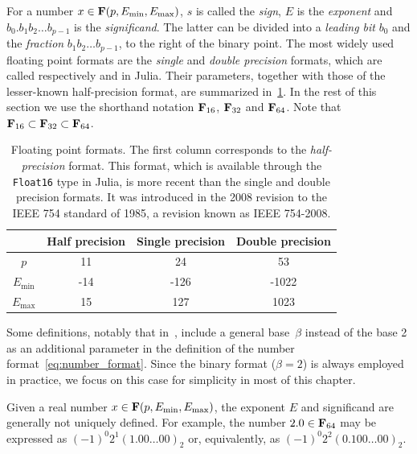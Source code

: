 For a number $x \in \mathbf F(p, E_{\min}, E_{\max})$,
$s$ is called the \emph{sign}, $E$ is the \emph{exponent} and
$b_0. b_1 b_2 \dots b_{p-1}$ is the \emph{significand}.
The latter can be divided into a \emph{leading bit} $b_0$ and the \emph{fraction} $b_1 b_2 \dots b_{p-1}$,
to the right of the binary point.
The most widely used floating point formats are the \emph{single} and \emph{double precision} formats,
which are called respectively  and  in Julia.
Their parameters,
together with those of the lesser-known half-precision format,
are summarized in~\cref{table:floating_point_formats}.
In the rest of this section we use the shorthand notation $\mathbf F_{16}$, $\mathbf F_{32}$ and $\mathbf F_{64}$.
Note that $\mathbf F_{16} \subset \mathbf F_{32} \subset \mathbf F_{64}$.
\begin{table}[ht]
    \centering
    \begin{tabular}{|c|c|c|c|}
        \hline
        & Half precision & Single precision & Double precision
        \\ \hline
        $p$ & 11 & 24 & 53
        \\ \hline
        $E_{\min}$ & -14 & -126 & -1022
        \\ \hline
        $E_{\max}$ & 15 & 127 & 1023
        \\ \hline
    \end{tabular}
    \caption{%
        Floating point formats.
        The first column corresponds to the \emph{half-precision} format.
        This format,
        which is available through the \texttt{Float16} type in Julia,
        is more recent than the single and double precision formats.
        It was introduced in the 2008 revision to the IEEE 754 standard of 1985,
        a revision known as IEEE 754-2008.
    }%
    \label{table:floating_point_formats}
\end{table}

\begin{remark}
    Some definitions,
    notably that in~\cite[Section 2.5.2]{MR2265914},
    include a general base~$\beta$ instead of the base 2
    as an additional parameter in the definition of the number format~\eqref{eq:number_format}.
    Since the binary format ($\beta = 2$) is always employed in practice,
    we focus on this case for simplicity in most of this chapter.
\end{remark}

\begin{remark}
    \label{remark:roundoff_non_uniqueness}
    Given a real number $x \in \mathbf F (p, E_{\min}, E_{\max})$,
    the exponent $E$ and significand  are generally not uniquely defined.
    For example, the number $2.0 \in \mathbf F_{64}$ may be expressed as $(-1)^0 2^1 (1.00\dots00)_2$ or, equivalently, as $(-1)^0 2^{2} (0.100\dots00)_2$.
\end{remark}

